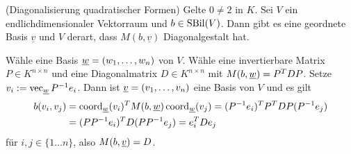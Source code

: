 \documentclass[../../main.tex]{subfiles}
\begin{document}
\begin{kor}\label{13.5.12} (Diagonalisierung quadratischer Formen) Gelte $0\neq 2$ in $K$. Sei $V$ ein endlichdimensionaler Vektorraum und $b\in \operatorname{SBil}(V)$. Dann gibt es eine geordnete Basis $\underline{v}$ und $V$ derart, dass $M(b,\underline{v})$ Diagonalgestalt hat.
\end{kor}
\begin{cproof}
Wähle eine Basis ${\underline w}=(w_1,\ldots ,w_n)$ von $V$. Wähle eine invertierbare Matrix $P\in K^{n\times n}$ und eine Diagonalmatrix $D\in K^{n\times n}$ mit $M(b,{\underline w})=P^TDP$. Setze $v_i:=\operatorname{vec}_{{\underline w}} P^{-1}e_i$. Dann ist ${\underline v}=(v_1,\ldots ,v_n)$ eine Basis von $V$ und es gilt
\begin{align*}
b(v_i,v_j)&=\operatorname{coord}_{{\underline w}}(v_i)^T M(b,{\underline w})\operatorname{coord}_{{\underline w}}(v_j)=(P^{-1}e_i)^TP^TDP(P^{-1}e_j)\\
&=(PP^{-1}e_i)^TD(PP^{-1}e_j)=e_i^TDe_j
\end{align*}
für $i,j\in\{1\ldots n\}$, also $M(b,{\underline v})=D$.
\end{cproof}
\end{document}
